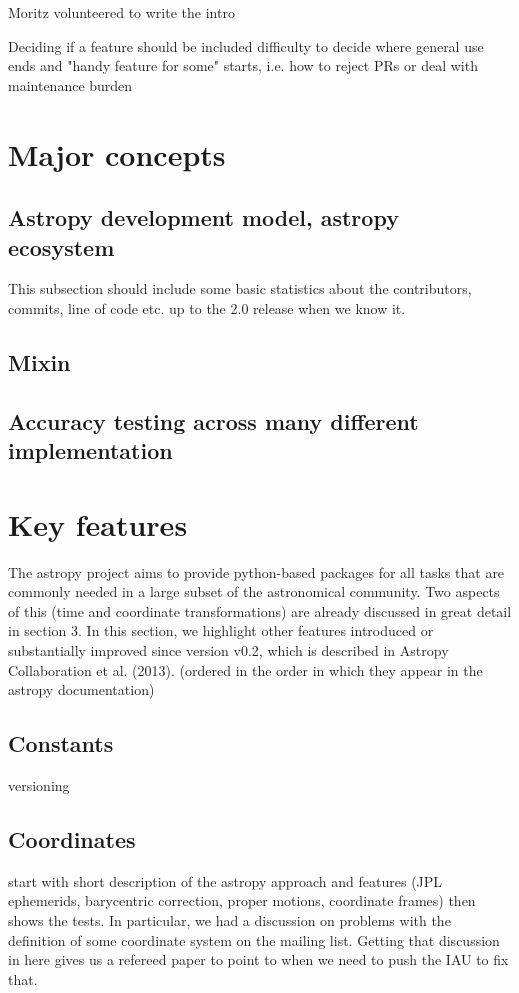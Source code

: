 \documentclass[modern]{aastex61}
\begin{document}
Moritz volunteered to write the intro


Deciding if a feature should be included
difficulty to decide where general use ends and "handy feature for some" starts, i.e. how to reject PRs or deal with maintenance burden

\section{Major concepts}
\subsection{Astropy development model, astropy ecosystem}
This subsection should include some basic statistics about the contributors, commits, line of code etc. up to the 2.0 release when we know it.
\subsection{Mixin}
\subsection{Accuracy testing across many different implementation}


\section{Key features}

The astropy project aims to provide python-based packages for all tasks that are commonly needed in a large subset of the astronomical community. Two aspects of this (time and coordinate transformations) are already discussed in great detail in section 3. In this section, we highlight other features introduced or substantially improved since version v0.2, which is described in Astropy Collaboration et al. (2013).
(ordered in the order in which they appear in the astropy documentation)

\subsection{Constants}
versioning 

\subsection{Coordinates}



start with short description of the astropy approach and features (JPL ephemerids, barycentric correction, proper motions, coordinate frames) then shows the tests. In particular, we had a discussion on problems with the definition of some coordinate system on the mailing list. Getting that discussion in here gives us a refereed paper to point to when we need to push the IAU to fix that.
\end{document}
